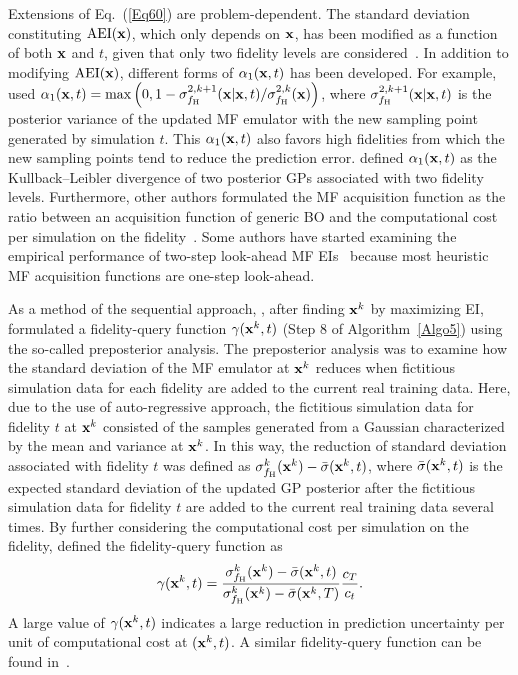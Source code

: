 \documentclass[iicol,sn-basic]{sn-jnl}%
\theoremstyle{thmstyleone}%
\theoremstyle{thmstyletwo}
\theoremstyle{thmstylethree}
\begin{document}
\begin{linenumbers}
Extensions of Eq.~(\ref{Eq60}) are problem-dependent.
The standard deviation constituting $\text{AEI}({\bf x})$, which only depends on ${\bf x}$, has been modified as a function of both ${\bf x}$ and $t$, given that only two fidelity levels are considered~\citep{YZhang2018,Fiore2021,Ruan2020,Grassi2023}.
In addition to modifying $\text{AEI}({\bf x})$, different forms of $\alpha_1({\bf x},t)$ has been developed.
For example, \cite{Sacher2021} used $\alpha_1({\bf x},t) = \max\left(0,1-\sigma_{f_\text{H}}^{2,k+1}({\bf x}|{\bf x},t)/\sigma_{f_\text{H}}^{2,k}({\bf x})\right)$, where $\sigma_{f_\text{H}}^{2,k+1}({\bf x}|{\bf x},t)$ is the posterior variance of the updated MF emulator with the new sampling point generated by simulation $t$.
This $\alpha_1({\bf x},t)$ also favors high fidelities from which the new sampling points tend to reduce the prediction error.
\cite{Huang2023} defined $\alpha_1({\bf x},t)$ as the Kullback–Leibler divergence of two posterior GPs associated with two fidelity levels.   
Furthermore, other authors formulated the MF acquisition function as the ratio between an acquisition function of generic BO and the computational cost per simulation on the fidelity~\citep{Ghoreishi2019,Winter2023,Foumani2023}.
Some authors have started examining the empirical performance of two-step look-ahead MF EIs~\citep{Ghoreishi2019,Fiore2023} because most heuristic MF acquisition functions are one-step look-ahead.

As a method of the sequential approach, \cite{Chen2016}, after finding ${\bf x}^k$ by maximizing EI, formulated a fidelity-query function $\gamma({\bf x}^k,t)$ (Step 8 of Algorithm~\ref{Algo5}) using the so-called preposterior analysis.
The preposterior analysis was to examine how the standard deviation of the MF emulator at ${\bf x}^k$ reduces when fictitious simulation data for each fidelity are added to the current real training data.
Here, due to the use of auto-regressive approach, the fictitious simulation data for fidelity $t$ at ${\bf x}^k$ consisted of the samples generated from a Gaussian characterized by the mean and variance at ${\bf x}^k$.
In this way, the reduction of standard deviation associated with fidelity $t$ was defined as $\sigma_{f_\text{H}}^k({\bf x}^k)-\bar{\sigma}({\bf x}^k,t)$, where $\bar{\sigma}({\bf x}^k,t)$ is the expected standard deviation of the updated GP posterior after the fictitious simulation data for fidelity $t$ are added to the current real training data several times.
By further considering the computational cost per simulation on the fidelity, \cite{Chen2016} defined the fidelity-query function as
\begin{equation}\label{Eq61}
		\gamma({\bf x}^k,t) = \frac{\sigma_{f_\text{H}}^k({\bf x}^k)-\bar{\sigma}({\bf x}^k,t)}{\sigma_{f_\text{H}}^k({\bf x}^k)-\bar{\sigma}({\bf x}^k,T)} \frac{c_T}{c_t}.
\end{equation}
A large value of $\gamma({\bf x}^k,t)$ indicates a large reduction in prediction uncertainty per unit of computational cost at $({\bf x}^k,t)$.
A similar fidelity-query function can be found in~\cite{Tran2020a,Tran2020b}.


\end{linenumbers}
\end{document}
